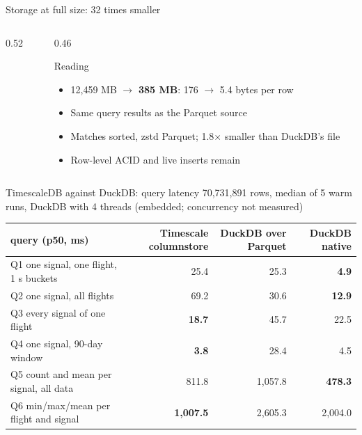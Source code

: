 \documentclass[aspectratio=169,10pt]{beamer}
\begin{document}
\begin{frame}[shrink=5]{Storage at full size: 32 times smaller}
\begin{columns}[T]
\begin{column}{0.52\textwidth}
\centering
{}
\end{column}
\begin{column}{0.46\textwidth}
\begin{block}{Reading}
\begin{itemize}
  \item 12,459 MB $\to$ \textbf{385 MB}: 176 $\to$ 5.4 bytes per row
  \item Same query results as the Parquet source
  \item Matches sorted, zstd Parquet; 1.8$\times$ smaller than DuckDB's file
  \item Row-level ACID and live inserts remain
\end{itemize}
\end{block}
\end{column}
\end{columns}
\end{frame}

\begin{frame}[shrink=5]{TimescaleDB against DuckDB: query latency}
\centering
{\scriptsize 70,731,891 rows, median of 5 warm runs, DuckDB with 4 threads (embedded; concurrency not measured)}\par\vspace{0.3em}
\begin{tabular}{@{}lrrr@{}}
\toprule
query (p50, ms) & Timescale columnstore & DuckDB over Parquet & DuckDB native\\
\midrule
Q1 one signal, one flight, 1 s buckets & 25.4 & 25.3 & \textbf{4.9}\\
Q2 one signal, all flights & 69.2 & 30.6 & \textbf{12.9}\\
Q3 every signal of one flight & \textbf{18.7} & 45.7 & 22.5\\
Q4 one signal, 90-day window & \textbf{3.8} & 28.4 & 4.5\\
Q5 count and mean per signal, all data & 811.8 & 1,057.8 & \textbf{478.3}\\
Q6 min/max/mean per flight and signal & \textbf{1,007.5} & 2,605.3 & 2,004.0\\
\bottomrule
\end{tabular}
\end{frame}
\end{document}
